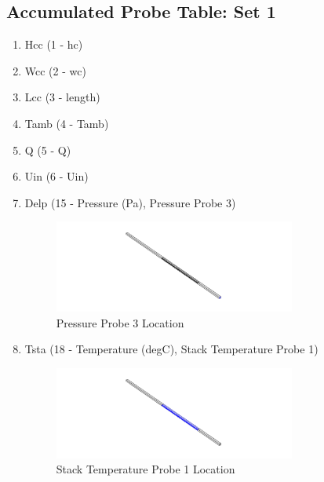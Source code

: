         \subsection{Accumulated Probe Table: Set 1}
            \begin{enumerate}
                \item Hcc (1 - hc)
                \item Wcc (2 - wc)
                \item Lcc (3 - length)
                \item Tamb (4 - Tamb)
                \item Q (5 - Q)
                \item Uin (6 - Uin)
                \item Delp (15 - Pressure (Pa), Pressure Probe 3)
                    \begin{figure}[H]
                        \centering
                        \includegraphics[width=0.75\textwidth]{00_Images/00_Pressure_Probe_3.png}
                        \caption{Pressure Probe 3 Location}
                    \end{figure}
                \item Tsta (18 - Temperature (degC), Stack Temperature Probe 1)
                    \begin{figure}[H]
                        \centering
                        \includegraphics[width=0.75\textwidth]{00_Images/00_Stack_Temperature_Probe_1.png}
                        \caption{Stack Temperature Probe 1 Location}
                    \end{figure}
            \end{enumerate}

